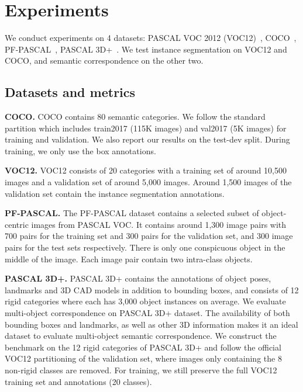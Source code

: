 \section{Experiments}

We conduct experiments on 4 datasets: PASCAL VOC 2012 (VOC12)~\cite{everingham2010pascal}, COCO~\cite{lin2014microsoft}, PF-PASCAL~\cite{ham2016proposal}, PASCAL 3D+~\cite{xiang2014beyond}. 
We test instance segmentation on VOC12 and COCO, and semantic correspondence on the other two.

\subsection{Datasets and metrics}

\textbf{COCO.} COCO contains 80 semantic categories. We follow the standard partition which includes train2017 (115K images) and val2017 (5K images) for training and validation. We also report our results on the test-dev split. During training, we only use the box annotations.

\textbf{VOC12.} VOC12 consists of 20 categories with a training set of around 10,500 images and a validation set of around 5,000 images. Around 1,500 images of the validation set contain the instance segmentation annotations.

\textbf{PF-PASCAL.} The PF-PASCAL dataset contains a selected subset of object-centric images from PASCAL VOC. It contains around 1,300 image pairs with 700 pairs for the training set and 300 pairs for the validation set, and 300 image pairs for the test sets respectively. There is only one conspicuous object in the middle of the image. Each image pair contain two intra-class objects.

\textbf{PASCAL 3D+.} PASCAL 3D+ contains the annotations of object poses, landmarks and 3D CAD models in addition to bounding boxes, and consists of 12 rigid categories where each has 3,000 object instances on average. We evaluate multi-object correspondence on PASCAL 3D+ dataset. The availability of both bounding boxes and landmarks, as well as other 3D information makes it an ideal dataset to evaluate multi-object semantic correspondence. We construct the benchmark on the 12 rigid categories of PASCAL 3D+ and follow the official VOC12 partitioning of the validation set, where images only containing the 8 non-rigid classes are removed. For training, we still preserve the full VOC12 training set and annotations (20 classes).

